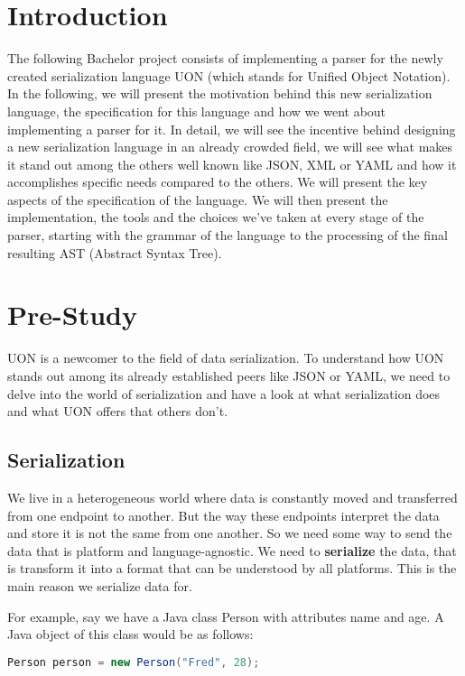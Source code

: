 \documentclass[12pt]{article}
\begin{document}
\tableofcontents
\pagebreak

\section{Introduction}
The following Bachelor project consists of implementing a parser for the newly created serialization language UON (which stands for Unified Object Notation). In the following, we will present the motivation behind this new serialization language, the specification for this language and how we went about implementing a parser for it. In detail, we will see the incentive behind designing a new serialization language in an already crowded field, we will see what makes it stand out among the others well known like JSON, XML or YAML and how it accomplishes specific needs compared to the others. We will present the key aspects of the specification of the language. We will then present the implementation, the tools and the choices we’ve taken at every stage of the parser, starting with the grammar of the language to the processing of the final resulting AST (Abstract Syntax Tree).

\pagebreak

\section{Pre-Study}
UON is a newcomer to the field of data serialization. To understand how UON stands out among its already established peers like JSON or YAML, we need to delve into the world of serialization and have a look at what serialization does and what UON offers that others don’t.

\subsection{Serialization}
We live in a heterogeneous world where data is constantly moved and transferred from one endpoint to another. But the way these endpoints interpret the data and store it is not the same from one another. So we need some way to send the data that is platform and language-agnostic. We need to \textbf{serialize} the data, that is transform it into a format that can be understood by all platforms. This is the main reason we serialize data for.

For example, say we have a Java class Person with attributes name and age. A Java object of this class would be as follows:

\begin{lstlisting}[language=java]
Person person = new Person("Fred", 28);
\end{lstlisting}
\end{document}
